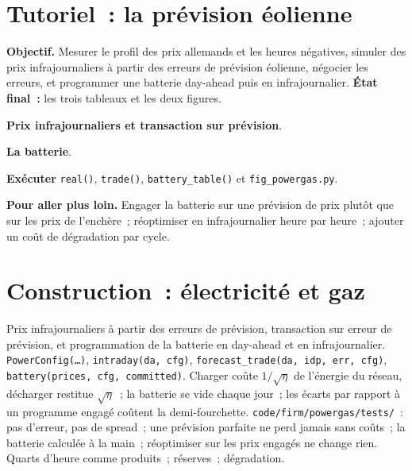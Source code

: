 \section{Tutoriel~: la prévision éolienne}\label{tut:s2:power-and-gas-trading:tut}

\begin{tutorial}
\textbf{Objectif.} Mesurer le profil des prix allemands et les heures négatives, simuler des prix infrajournaliers à partir des erreurs de prévision éolienne, négocier les erreurs, et programmer une batterie
day-ahead puis en infrajournalier. \textbf{État final~:} les trois tableaux et les deux figures.
\begin{tutsteps}
\item \textbf{Prix infrajournaliers et transaction sur prévision}.
\label{lst:s2:power-and-gas-trading:trade}
\item \textbf{La batterie}.
\label{lst:s2:power-and-gas-trading:battery}
\item \textbf{Exécuter} \texttt{real()}, \texttt{trade()}, \texttt{battery\_table()} et \texttt{fig\_powergas.py}.
\end{tutsteps}
\textbf{Pour aller plus loin.} Engager la batterie sur une prévision de prix plutôt que sur les prix de l'enchère~; réoptimiser en infrajournalier heure par heure~; ajouter
un coût de dégradation par cycle.
\end{tutorial}

\section{Construction~: électricité et gaz}\label{bld:s2:power-and-gas-trading:powergas}

\begin{build}
 Prix infrajournaliers à partir des erreurs de prévision, transaction sur erreur de prévision, et programmation de la batterie en day-ahead et en infrajournalier.
 \texttt{PowerConfig(\dots)}, \texttt{intraday(da, cfg)}, \texttt{forecast\_trade(da, idp, err, cfg)},
\texttt{battery(prices, cfg, committed)}.
 Charger coûte $1/\sqrt{\eta}$ de l'énergie du réseau, décharger restitue $\sqrt{\eta}$~; la batterie se vide chaque jour~; les écarts
par rapport à un programme engagé coûtent la demi-fourchette.
 \texttt{code/firm/powergas/tests/}~: pas d'erreur, pas de spread~; une prévision parfaite ne perd jamais sans coûts~; la batterie calculée à la main~;
réoptimiser sur les prix engagés ne change rien.
 Quarts d'heure comme produits~; réserves~; dégradation.
\end{build}

